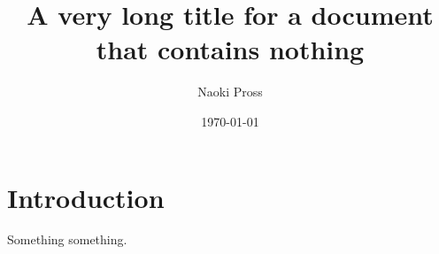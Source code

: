 \documentclass{article}
\title{A very long title for a document that contains nothing}
\author{Naoki Pross}
\date{\today}
\begin{document}
\maketitle

\section{Introduction}

Something something.
\end{document}
